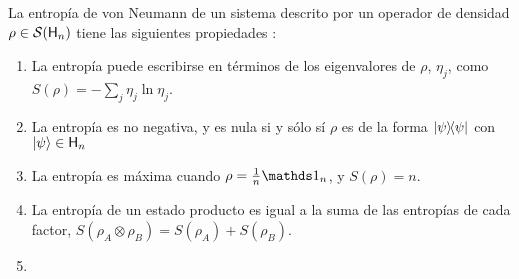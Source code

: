La entropía de von Neumann de un sistema descrito por un operador de densidad $\rho\in\mathcal{S}({\sf H}_{n})$ tiene las siguientes propiedades \cite{Chuang}:
\begin{enumerate}
    \item La entropía puede escribirse en términos de los eigenvalores de $\rho$, $\eta_{j}$, como $S(\rho)=-\sum_{j}\eta_{j}\ln{\eta_{j}}$.
    \item La entropía es no negativa, y es nula si y sólo sí $\rho$ es de la forma $\dyad{\psi}$ con $\ket{\psi}\in{\sf H}_{n}$
    \item La entropía es máxima cuando $\rho=\frac{1}{n}\Id_{n}$, y $S(\rho)=n$.
    \item La entropía de un estado producto es igual a la suma de las entropías de cada factor, $S(\rho_{A}\otimes\rho_{B})=S(\rho_{A})+S(\rho_{B})$. 
    \item {}
\end{enumerate}